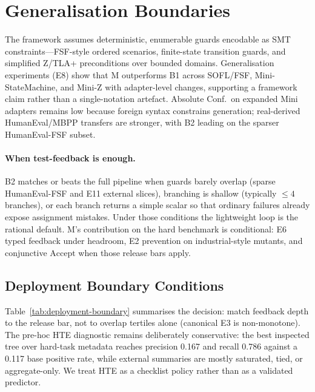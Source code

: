 \section{Generalisation Boundaries}
\label{sec:disc:generalisation}

The framework assumes deterministic, enumerable guards encodable as SMT
constraints---FSF-style ordered scenarios, finite-state transition guards,
and simplified Z/TLA+ preconditions over bounded domains.
Generalisation experiments (E8) show that M outperforms B1 across SOFL/FSF,
Mini-StateMachine, and Mini-Z with adapter-level changes, supporting a
framework claim rather than a single-notation artefact.
Absolute Conf.\ on expanded Mini adapters remains low because foreign syntax
constrains generation; real-derived HumanEval/MBPP transfers are stronger,
with B2 leading on the sparser HumanEval-FSF subset.

\paragraph{When test-feedback is enough.}
B2 matches or beats the full pipeline when guards barely overlap (sparse
HumanEval-FSF and E11 external slices), branching is shallow
(typically ${\le}4$ branches), or each branch returns a simple scalar so that
ordinary failures already expose assignment mistakes.
Under those conditions the lightweight loop is the rational default.
M's contribution on the hard benchmark is conditional: E6 typed
feedback under headroom, E2 prevention on industrial-style mutants, and
conjunctive $\mathrm{Accept}$ when those release bars apply.

\subsection{Deployment Boundary Conditions}
\label{sec:disc:deployment}

Table~\ref{tab:deployment-boundary} summarises the decision: match feedback
depth to the release bar, not to overlap tertiles alone (canonical E3 is
non-monotone).
The pre-hoc HTE diagnostic remains deliberately conservative: the best
inspected tree over hard-task metadata reaches precision 0.167 and recall
0.786 against a 0.117 base positive rate, while external summaries are mostly
saturated, tied, or aggregate-only.
We treat HTE as a checklist policy rather than as a validated predictor.


